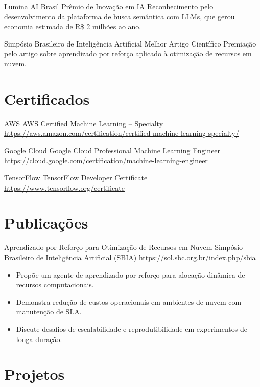 \documentclass[a4paper, serif, 10pt]{moderncv}
\begin{document}
        {Lumina AI Brasil}
        {Prêmio de Inovação em IA}
        {}
        {}
        {Reconhecimento pelo desenvolvimento da plataforma de busca semântica com LLMs, que gerou economia estimada de R\$ 2 milhões ao ano.}

        {Simpósio Brasileiro de Inteligência Artificial}
        {Melhor Artigo Científico}
        {}
        {}
        {Premiação pelo artigo sobre aprendizado por reforço aplicado à otimização de recursos em nuvem.}
\section{Certificados}

        {AWS}
        {AWS Certified Machine Learning – Specialty}
        {\url{https://aws.amazon.com/certification/certified-machine-learning-specialty/}}
        {}
        {}

        {Google Cloud}
        {Google Cloud Professional Machine Learning Engineer}
        {\url{https://cloud.google.com/certification/machine-learning-engineer}}
        {}
        {}

        {TensorFlow}
        {TensorFlow Developer Certificate}
        {\url{https://www.tensorflow.org/certificate}}
        {}
        {}
\section{Publicações}

        {Aprendizado por Reforço para Otimização de Recursos em Nuvem}
        {Simpósio Brasileiro de Inteligência Artificial (SBIA)}
        {\url{https://sol.sbc.org.br/index.php/sbia}}
        {}
        {\begin{itemize}
\item Propõe um agente de aprendizado por reforço para alocação dinâmica de recursos computacionais.
\item Demonstra redução de custos operacionais em ambientes de nuvem com manutenção de SLA.
\item Discute desafios de escalabilidade e reprodutibilidade em experimentos de longa duração.
\end{itemize}}
\section{Projetos}
\end{document}
